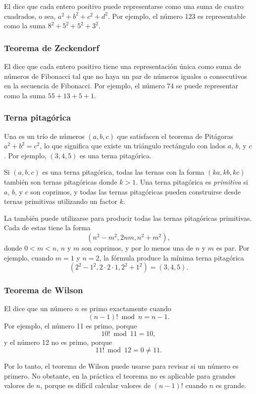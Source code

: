 
El  dice que cada entero positivo puede
representarse como una suma de cuatro cuadrados, o sea, $a^2+b^2+c^2+d^2$.
Por ejemplo, el número 123 es representable como la suma $8^2+5^2+5^2+3^2$.

\subsubsection{Teorema de Zeckendorf}


El  dice que cada entero positivo tiene una
representación única como suma de números de Fibonacci tal que no haya
un par de números iguales o consecutivos en la secuencia de Fibonacci.
Por ejemplo, el número 74 se puede representar como la suma $55+13+5+1$.

\subsubsection{Terna pitagórica}


Una  es un trío de números $(a,b,c)$ que satisfacen
el teorema de Pitágoras $a^2+b^2=c^2$, lo que significa que existe un triángulo
rectángulo con lados $a$, $b$, y $c$. Por ejemplo, $(3,4,5)$ es una terna
pitagórica.

Si $(a,b,c)$ es una terna pitagórica, todas las ternas con la forma $(ka,kb,kc)$
también son ternas pitagóricas donde $k>1$. Una terna pitagórica es
\emph{primitiva} si $a$, $b$, y $c$ son coprimos, y todas las ternas
pitagóricas pueden construirse desde ternas primitivas utilizando un factor $k$.

La  también puede utilizarse para producir todas
las ternas pitagóricas primitivas. Cada de estas tiene la forma
\[(n^2-m^2,2nm,n^2+m^2),\] donde $0<m<n$, $n$ y $m$ son coprimos, y por lo
menos una de $n$ y $m$ es par. Por ejemplo, cuando $m=1$ y $n=2$, la fórmula
produce la mínima terna pitagórica
\[(2^2-1^2,2\cdot2\cdot1,2^2+1^2)=(3,4,5).\]

\subsubsection{Teorema de Wilson}


El  dice que un número $n$ es primo exactamente cuando
\[(n-1)! \bmod n = n-1.\]
Por ejemplo, el número 11 es primo, porque
\[10! \bmod 11 = 10,\]
y el número 12 no es primo, porque
\[11! \bmod 12 = 0 \neq 11.\]

Por lo tanto, el teorema de Wilson puede usarse para revisar si un número
es primero. No obstante, en la práctica el teorema no es aplicable para
grandes valores de $n$, porque es difícil calcular valores de $(n-1)!$
cuando $n$ es grande.
